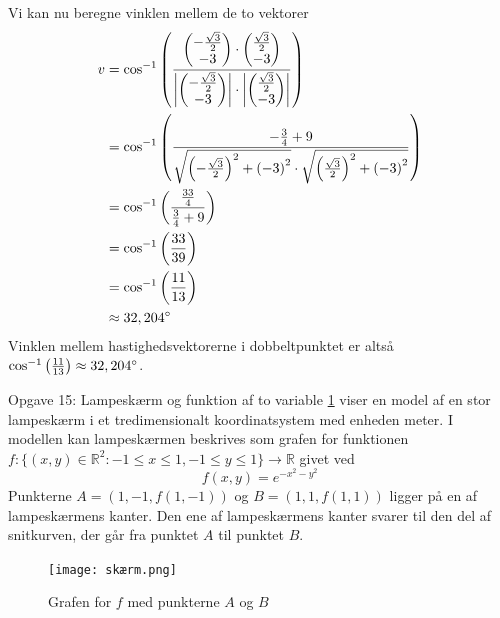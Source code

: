\documentclass{article}
\begin{document}
Vi kan nu beregne vinklen mellem de to vektorer
\begin{equation*}
\begin{split}
  v&=\cos^{-1}\left(\frac{\mqty(-\frac{\sqrt{3} }{2}\\ -3) \cdot \mqty(\frac{\sqrt{3} }{2}\\ -3) }{\abs{\mqty(-\frac{\sqrt{3} }{2}\\ -3)} \cdot \abs{\mqty(\frac{\sqrt{3} }{2}\\ -3)}}\right) \\
  &=\cos^{-1}\left( \frac{-\frac{3}{4}+9}{\sqrt{\left(-\frac{\sqrt{3} }{2}\right)^2+\left(-3\right)^2} \cdot \sqrt{\left(\frac{\sqrt{3} }{2}\right)^2 + \left(-3\right)^2} }\right)\\
  &=\cos^{-1}\left(\frac{\frac{33}{4}}{\frac{3}{4}+9}\right) \\
  &=\cos^{-1}\left(\frac{33}{39}\right) \\
  &=\cos^{-1}\left(\frac{11}{13}\right) \\
  &\approx 32,204 \degree 
\end{split}
\end{equation*}
Vinklen mellem hastighedsvektorerne i dobbeltpunktet er altså $\cos^{-1}\left(\frac{11}{13}\right) \approx 32,204 \degree $.
\begin{question}{Opgave 15: Lampeskærm og funktion af to variable}{}
  \cref{fig:skærm} viser en model af en stor lampeskærm i et tredimensionalt koordinatsystem med enheden meter. I modellen kan lampeskærmen beskrives som grafen for funktionen $f:\{(x,y)\in \mathbb{R}^2 : -1 \leq x \leq 1, -1 \leq y \leq 1\} \to \mathbb{R}$ givet ved 
   \[
   f(x,y)= e^{-x^2-y^2} 
   \] 
   Punkterne $A=(1,-1,f(1,-1))$ og $B=(1,1,f(1,1))$ ligger på en af lampeskærmens kanter. 
Den ene af lampeskærmens kanter svarer til den del af snitkurven, der går fra punktet $A$ til punktet $B$. 
\end{question}
\begin{figure}[H]
\begin{center}
  \texttt{[image: skærm.png]}
\end{center}
\caption{Grafen for $f$ med punkterne $A$ og $B$ }
\label{fig:skærm}
\end{figure}
\end{document}

